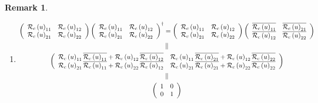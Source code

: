 \documentclass[aps,preprint]{revtex4}%
\newtheorem{remark}[theorem]{Remark}
\begin{document}
\begin{remark}
\begin{enumerate}
\begin{enumerate}
\end{enumerate}

\item
\begin{gather}
\left(
\begin{array}
[c]{cc}%
\mathcal{R}_{c}\left(  u\right)  _{11} & \mathcal{R}_{c}\left(  u\right)
_{12}\\
\mathcal{R}_{c}\left(  u\right)  _{21} & \mathcal{R}_{c}\left(  u\right)
_{22}%
\end{array}
\right)  \left(
\begin{array}
[c]{cc}%
\mathcal{R}_{c}\left(  u\right)  _{11} & \mathcal{R}_{c}\left(  u\right)
_{12}\\
\mathcal{R}_{c}\left(  u\right)  _{21} & \mathcal{R}_{c}\left(  u\right)
_{22}%
\end{array}
\right)  ^{\dagger}=\left(
\begin{array}
[c]{cc}%
\mathcal{R}_{c}\left(  u\right)  _{11} & \mathcal{R}_{c}\left(  u\right)
_{12}\\
\mathcal{R}_{c}\left(  u\right)  _{21} & \mathcal{R}_{c}\left(  u\right)
_{22}%
\end{array}
\right)  \left(
\begin{array}
[c]{cc}%
\overline{\mathcal{R}_{c}\left(  u\right)  _{11}} & \overline{\mathcal{R}%
_{c}\left(  u\right)  _{21}}\\
\overline{\mathcal{R}_{c}\left(  u\right)  _{12}} & \overline{\mathcal{R}%
_{c}\left(  u\right)  _{22}}%
\end{array}
\right)  \\
\parallel\\
\left(
\begin{array}
[c]{cc}%
\mathcal{R}_{c}\left(  u\right)  _{11}\overline{\mathcal{R}_{c}\left(
u\right)  _{11}}+\mathcal{R}_{c}\left(  u\right)  _{12}\overline
{\mathcal{R}_{c}\left(  u\right)  _{12}} & \mathcal{R}_{c}\left(  u\right)
_{11}\overline{\mathcal{R}_{c}\left(  u\right)  _{21}}+\mathcal{R}_{c}\left(
u\right)  _{12}\overline{\mathcal{R}_{c}\left(  u\right)  _{22}}\\
\mathcal{R}_{c}\left(  u\right)  _{21}\overline{\mathcal{R}_{c}\left(
u\right)  _{11}}+\mathcal{R}_{c}\left(  u\right)  _{22}\overline
{\mathcal{R}_{c}\left(  u\right)  _{12}} & \mathcal{R}_{c}\left(  u\right)
_{21}\overline{\mathcal{R}_{c}\left(  u\right)  _{21}}+\mathcal{R}_{c}\left(
u\right)  _{22}\overline{\mathcal{R}_{c}\left(  u\right)  _{22}}%
\end{array}
\right)  \\
\parallel\\
\left(
\begin{array}
[c]{cc}%
1 & 0\\
0 & 1
\end{array}
\right)
\end{gather}



\end{enumerate}
\end{remark}
\end{document}
